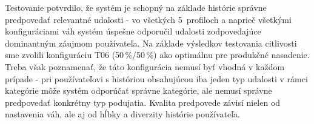 Testovanie potvrdilo, že systém je schopný na základe histórie správne predpovedať
relevantné udalosti - vo všetkých 5~profiloch a naprieč všetkými konfiguráciami
váh systém úspešne odporučil udalosti zodpovedajúce dominantným záujmom
používateľa. Na základe výsledkov testovania citlivosti sme zvolili konfiguráciu
T06 (50\,\%/50\,\%) ako optimálnu pre produkčné nasadenie. Treba však poznamenať,
že táto konfigurácia nemusí byť vhodná v každom prípade - pri používateľovi
s históriou obsahujúcou iba jeden typ udalosti v rámci kategórie môže systém
odporúčať správne kategórie, ale nemusí správne predpovedať konkrétny typ podujatia.
Kvalita predpovede závisí nielen od nastavenia váh, ale aj od hĺbky a diverzity
histórie používateľa.


